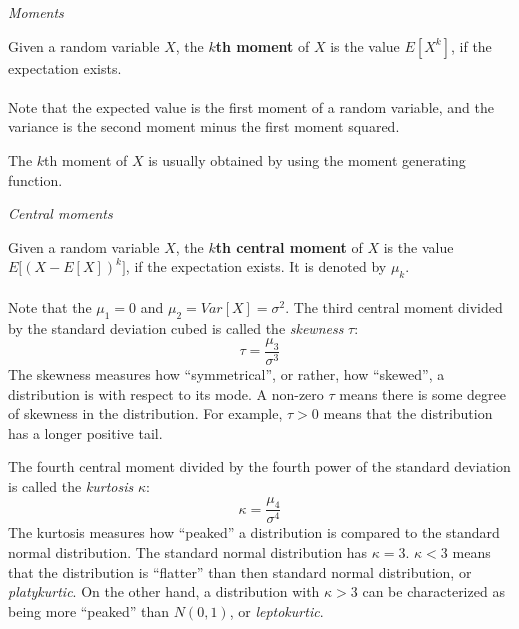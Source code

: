 \documentclass{article}
\begin{document}
\textit{Moments}\\
\par
Given a random variable $X$, the \textbf{$k$th moment} of $X$ is the value $E[X^k]$, if the expectation exists.\\
\\
Note that the expected value is the first moment of a random variable, and the variance is the second moment minus the first moment squared.\\
\par
The $k$th moment of $X$ is usually obtained by using the moment generating function.
\par
\par
\textit{Central moments}\\
\par
Given a random variable $X$, the \textbf{$k$th central moment} of $X$ is the value $E\big[(X-E[X])^k\big]$, if the expectation exists.  It is denoted by $\mu_k$.\\
\\
Note that the $\mu_1=0$ and $\mu_2=Var[X]=\sigma^2$. The third central moment divided by the standard deviation cubed is called the \emph{skewness} $\tau$:  $$\tau=\frac{\mu_3}{\sigma^3}$$  The skewness measures how ``symmetrical'', or rather, how ``skewed'', a distribution is with respect to its mode.  A non-zero $\tau$ means there is some degree of skewness in the distribution.  For example, $\tau>0$ means that the distribution has a longer positive tail.  
\par
The fourth central moment divided by the fourth power of the standard deviation is called the \emph{kurtosis} $\kappa$:
$$\kappa=\frac{\mu_4}{\sigma^4}$$  The kurtosis measures how ``peaked'' a distribution is compared to the standard normal distribution.  The standard normal distribution has $\kappa=3$.  $\kappa<3$ means that the distribution is ``flatter'' than then standard normal distribution, or \emph{platykurtic}.  On the other hand, a distribution with $\kappa>3$ can be characterized as being more ``peaked'' than $N(0,1)$, or \emph{leptokurtic}.
\end{document}
